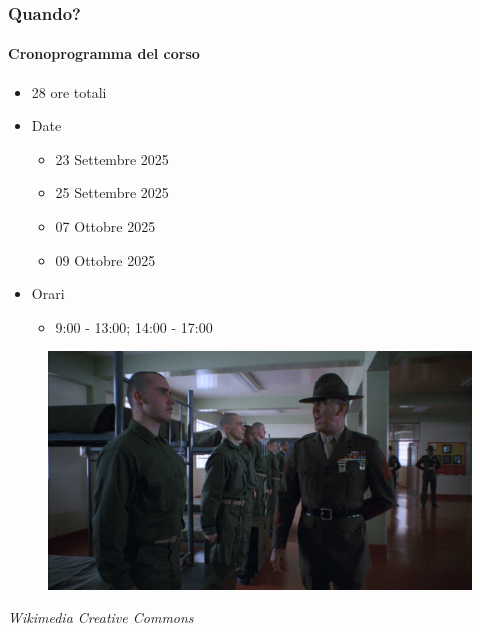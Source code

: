 \begin{frame}[t,fragile] \frametitle{Quando?}
\framesubtitle{Cronoprogramma del corso}
    \begin{itemize}[leftmargin=10pt,align=right]
        \item[\alert{\faHandORight}] 28 ore totali
        \item[\alert{\faHandORight}] Date
        \begin{itemize}[leftmargin=10pt,align=right]
            \item[\alert{\faHandORight}] 23 Settembre 2025
            \item[\alert{\faHandORight}] 25 Settembre 2025
            \item[\alert{\faHandORight}] 07 Ottobre 2025
            \item[\alert{\faHandORight}] 09 Ottobre 2025
        \end{itemize}
        \item[\alert{\faHandORight}] Orari
        \begin{itemize}[leftmargin=10pt,align=right]
            \item[\alert{\faHandORight}] 9:00 - 13:00; 14:00 - 17:00
        \end{itemize}         
    \end{itemize}
    \begin{center}
        \begin{minipage}[b]{.45\textwidth}
		    \begin{figure}[ht]
			    \includegraphics[width=\textwidth]{img/full-metal-jacket.jpg}
		    \end{figure}
            \begin{flushright}
                \vspace*{-10pt}
                {\tiny\textit{\textcopyright Wikimedia Creative Commons}}
            \end{flushright}
	    \end{minipage}
    \end{center}
\end{frame}

